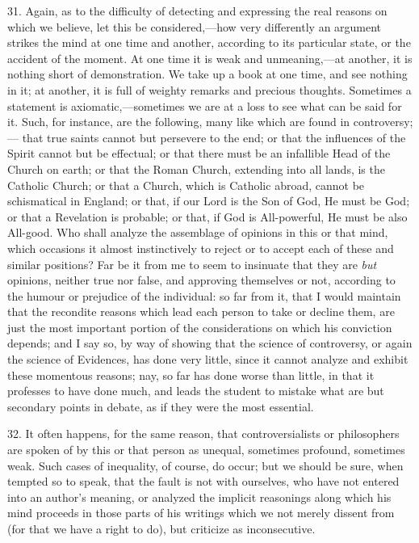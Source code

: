 31. Again, as to the difficulty of detecting and expressing the
real reasons on which we believe, let this be considered,—how very
differently an argument strikes the mind at one time and another,
according to its particular state, or the accident of the moment. At
one time it is weak and unmeaning,—at another, it is nothing short
of demonstration. We take up a book at one time, and see nothing in
it; at another, it is full of weighty remarks and precious thoughts.
Sometimes a statement is axiomatic,—sometimes we are at a loss to
see what can be said for it. Such, for instance, are the following,
many like which are found in controversy;— that true saints cannot
but persevere to the end; or that the influences of the Spirit cannot
but be effectual; or that there must be an infallible Head of the
Church on earth; or that the Roman Church, extending into all lands,
is the Catholic Church; or that a Church, which is Catholic abroad,
cannot be schismatical in England; or that, if our Lord is the Son of
God, He must be God; or that a Revelation is probable; or that, if God
is All-powerful, He must be also All-good. Who shall analyze the
assemblage of opinions in this or that mind, which occasions it almost
instinctively to reject or to accept each of these and similar
positions? Far be it from me to seem to insinuate that they are \emph{but}
opinions, neither true nor false, and approving themselves or not,
according to the humour or prejudice of the individual: so far from
it, that I would maintain that the recondite reasons which lead each
person to take or decline them, are just the most important portion of
the considerations on which his conviction depends; and I say so, by
way of showing that the science of controversy, or again the science
of Evidences, has done very little, since it cannot analyze and
exhibit these momentous reasons; nay, so far has done worse than
little, in that it professes to have done much, and leads the student
to mistake what are but secondary points in debate, as if they were
the most essential.

32. It often happens, for the same reason, that controversialists
or philosophers are spoken of by this or that person as unequal,
sometimes profound, sometimes weak. Such cases of inequality, of
course, do occur; but we should be sure, when tempted so to speak,
that the fault is not with ourselves, who have not entered into an
author's meaning, or analyzed the implicit reasonings along which his
mind proceeds in those parts of his writings which we not merely
dissent from (for that we have a right to do), but criticize as
inconsecutive.

